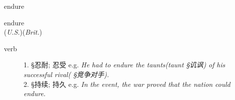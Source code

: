 \documentclass[avery5372, grid]{flashcards}
\begin{document}
\begin{flashcard}[{\B 7 Habits} {\S 词汇}]{\Huge endure}
	\begin{center}
		{\LARGE en\textbullet dure}\\
		(\textit{U.S.})\hspace{0.25cm}(\textit{Brit.})
	\end{center}
	\begin{description}
		
		\item[verb] %
			
			1. {\S 忍耐; 忍受} e.g. \textit{He had to endure the taunts\textnormal{(taunt  {\S 讥讽})} of his successful rival\textnormal{( {\S 竞争对手})}.}\\
			
			2. {\S 持续; 持久} e.g. \textit{In the event, the war proved that the nation could endure.}\\
			
		
			
			
			
		

\end{description}
\end{flashcard}
\end{document}
